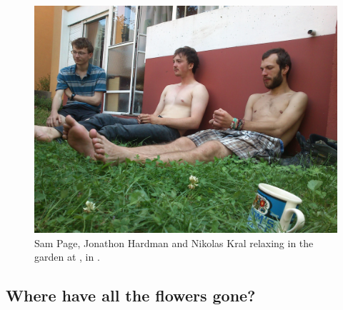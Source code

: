 

\begin{figure}
\checkoddpage \ifoddpage \forcerectofloat \else \forceversofloat \fi
   \centering
\includegraphics[width = \textwidth]{2012/piss_bandits/JarvistMooreFrost-DSC_0288--orig.jpg}
\caption{Sam Page, Jonathon Hardman and Nikolas Kral relaxing in the garden at , in . } \label{flat garden}
\end{figure}

\subsection{Where have all the flowers gone?}


